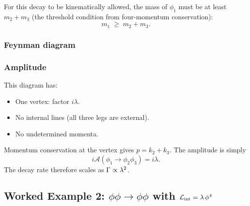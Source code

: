 \documentclass[../main.tex]{subfiles}
\begin{document}
For this decay to be kinematically allowed, the mass of $\phi_1$ must be at least $m_2 + m_3$ (the threshold condition from four-momentum conservation):
\begin{equation}
  m_1 \;\geq\; m_2 + m_3.
  \label{eq:lec05:decay-threshold}
\end{equation}

\subsubsection*{Feynman diagram}

\begin{center}
\end{center}

\subsubsection*{Amplitude}

This diagram has:
\begin{itemize}
  \item One vertex: factor $i\lambda$.
  \item No internal lines (all three legs are external).
  \item No undetermined momenta.
\end{itemize}
Momentum conservation at the vertex gives $p = k_2 + k_3$.  The amplitude is simply
\begin{equation}
  i\mathcal{A}(\phi_1 \to \phi_2 \phi_3)
  = i\lambda.
  \label{eq:lec05:phi1-decay}
\end{equation}
The decay rate therefore scales as $\Gamma \propto \lambda^2$.

\subsection*{Worked Example 2: $\phi\phi \to \phi\phi$ with $\mathcal{L}_{\rm int} = \lambda\,\phi^4$}
\end{document}
